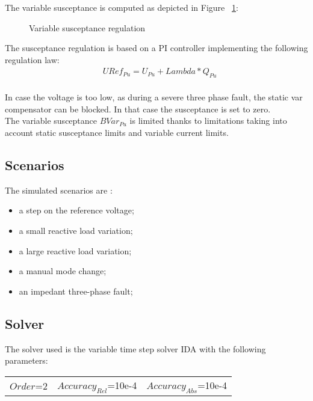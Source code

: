 \documentclass[a4paper, 12pt]{report}
\begin{document}
The variable susceptance is computed as depicted in Figure ~\ref{Regulation}:
\begin{figure}[H]
\centering
{}
\caption{Variable susceptance regulation}
\label{Regulation}
\end{figure}

The susceptance regulation is based on a PI controller implementing the following regulation law:
\[
\begin{aligned}
& URef_{Pu} = U_{Pu} + Lambda*Q_{Pu}\\
\end{aligned}
\]

In case the voltage is too low, as during a severe three phase fault, the static var compensator can be blocked. In that case the susceptance is set to zero.\\

The variable susceptance $BVar_{Pu}$ is limited thanks to limitations taking into account static susceptance limits and variable current limits.

\subsection{Scenarios}
The simulated scenarios are :
\begin{itemize}
\item a step on the reference voltage;
\item a small reactive load variation;
\item a large reactive load variation;
\item a manual mode change;
\item an impedant three-phase fault;
\end{itemize}

\subsection{Solver}
The solver used is the variable time step solver IDA with the following parameters:
\begin{center}
\begin{tabular}{l|l|l}
   $Order$=2 & $Accuracy_{Rel}$=10e-4 & $Accuracy_{Abs}$=10e-4 \\
\end{tabular}
\end{center}
\end{document}
